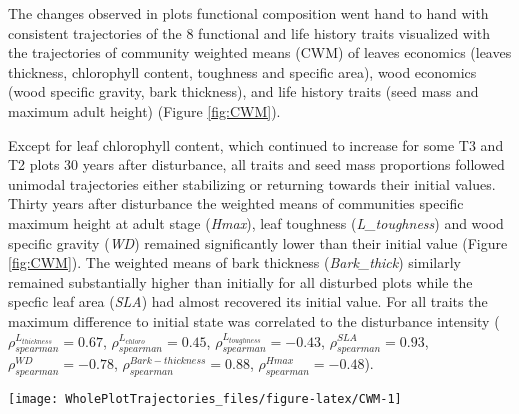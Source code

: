 \documentclass[fleqn,10pt]{ArtEcoFoG} %
\theoremstyle{definition}
\theoremstyle{definition}
\theoremstyle{definition}
\theoremstyle{remark}
\begin{document}
The changes observed in plots functional composition went hand to hand
with consistent trajectories of the 8 functional and life history traits
visualized with the trajectories of community weighted means (CWM) of
leaves economics (leaves thickness, chlorophyll content, toughness and
specific area), wood economics (wood specific gravity, bark thickness),
and life history traits (seed mass and maximum adult height) (Figure
\ref{fig:CWM}).

Except for leaf chlorophyll content, which continued to increase for
some T3 and T2 plots 30 years after disturbance, all traits and seed
mass proportions followed unimodal trajectories either stabilizing or
returning towards their initial values. Thirty years after disturbance
the weighted means of communities specific maximum height at adult stage
(\emph{Hmax}), leaf toughness (\emph{L\_toughness}) and wood specific
gravity (\emph{WD}) remained significantly lower than their initial
value (Figure \ref{fig:CWM}). The weighted means of bark thickness
(\emph{Bark\_thick}) similarly remained substantially higher than
initially for all disturbed plots while the specfic leaf area
(\emph{SLA}) had almost recovered its initial value. For all traits the
maximum difference to initial state was correlated to the disturbance
intensity (\(\rho_{spearman}^{L_{thickness}}=0.67\),
\(\rho_{spearman}^{L_{chloro}}=0.45\),
\(\rho_{spearman}^{L_{toughness}}=-0.43\),
\(\rho_{spearman}^{SLA}=0.93\), \(\rho_{spearman}^{WD}=-0.78\),
\(\rho_{spearman}^{Bark-thickness}=0.88\),
\(\rho_{spearman}^{Hmax}=-0.48\)).

\begin{figure*}

{\centering \texttt{[image: WholePlotTrajectories\_files/figure-latex/CWM-1]} 

}

\caption{Trajectories of the communities weighted means (CWM) over 30 years after disturbance of 4 leaf traits (Leaf thickness, \emph{L\_thickness}, chlorophyll content, \emph{L\_chloro}, toughness, \emph{L\_toughness} and specific area, \emph{SLA}), 2 stem traits (wood specific gravity, \emph{WD}, and bark thickness, \emph{Bark-thick}) and one life trait (Specific maximum height at adult stage, \emph{Hmax}). Trajectories correspond to the median (solid line) and 0.025 and 0.975 percentile (gray envelope) observed after 50 iteration of the taxonomic uncertainty propagation and the missing trait value filling processes. Initial treatments are represented by solid lines colors with green for control, blue for T1,orange for T2 and red for T3.}\label{fig:CWM}
\end{figure*}
\end{document}
